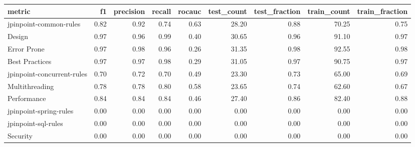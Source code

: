 \begin{tabular}{lrrrrrrrr}
\toprule
metric &   f1 &  precision &  recall &  rocauc &  test\_count &  test\_fraction &  train\_count &  train\_fraction \\
\midrule
jpinpoint-common-rules     & 0.82 &       0.92 &    0.74 &    0.63 &       28.20 &           0.88 &        70.25 &            0.75 \\
Design                     & 0.97 &       0.96 &    0.99 &    0.40 &       30.65 &           0.96 &        91.10 &            0.97 \\
Error Prone                & 0.97 &       0.98 &    0.96 &    0.26 &       31.35 &           0.98 &        92.55 &            0.98 \\
Best Practices             & 0.97 &       0.97 &    0.98 &    0.29 &       31.05 &           0.97 &        90.75 &            0.97 \\
jpinpoint-concurrent-rules & 0.70 &       0.72 &    0.70 &    0.49 &       23.30 &           0.73 &        65.00 &            0.69 \\
Multithreading             & 0.78 &       0.78 &    0.80 &    0.58 &       23.65 &           0.74 &        62.60 &            0.67 \\
Performance                & 0.84 &       0.84 &    0.84 &    0.46 &       27.40 &           0.86 &        82.40 &            0.88 \\
jpinpoint-spring-rules     & 0.00 &       0.00 &    0.00 &    0.00 &        0.00 &           0.00 &         0.00 &            0.00 \\
jpinpoint-sql-rules        & 0.00 &       0.00 &    0.00 &    0.00 &        0.00 &           0.00 &         0.00 &            0.00 \\
Security                   & 0.00 &       0.00 &    0.00 &    0.00 &        0.00 &           0.00 &         0.00 &            0.00 \\
\bottomrule
\end{tabular}
